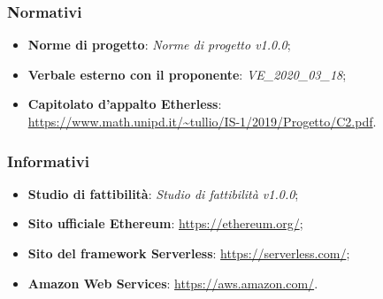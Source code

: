 \subsubsection{Normativi}
\begin{itemize}
	\item \textbf{Norme di progetto}: \textit{Norme di progetto v1.0.0};
	\item \textbf{Verbale esterno con il proponente}:\textit{ VE\_2020\_03\_18};
	\item \textbf{Capitolato d'appalto Etherless}:\\\url{https://www.math.unipd.it/~tullio/IS-1/2019/Progetto/C2.pdf}.
\end{itemize}
\subsubsection{Informativi}
\begin{itemize}
	\item \textbf{Studio di fattibilità}: \textit{Studio di fattibilità v1.0.0};
	\item \textbf{Sito ufficiale Ethereum}: \url{https://ethereum.org/};
	\item \textbf{Sito del framework Serverless}: \url{https://serverless.com/};
	\item \textbf{Amazon Web Services}: \url{https://aws.amazon.com/}.
\end{itemize}